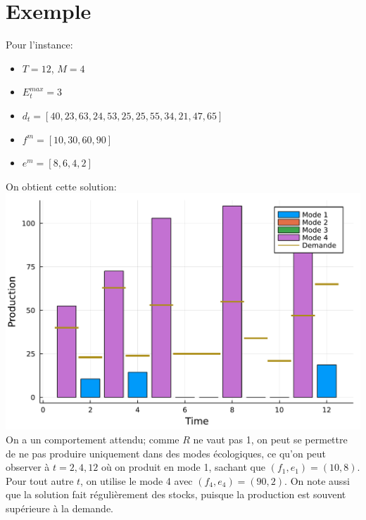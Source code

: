 \documentclass{article}
\begin{document}
	\section{Exemple}
	Pour l'instance:
	\begin{itemize}
		\item $T = 12$, $M = 4$
		\item $E_t^{max} = 3$
		\item $d_t = [40, 23, 63, 24, 53, 25, 25, 55, 34, 21, 47, 65]$
		\item $f^m = [10, 30, 60, 90]$
		\item $e^m = [8, 6, 4, 2]$
	\end{itemize}
	On obtient cette solution:\\
	\includegraphics[width=\textwidth]{exemple.pdf}
	\normalsize
	On a un comportement attendu; comme $R$ ne vaut pas 1, on peut se permettre de ne pas produire uniquement dans des modes écologiques, ce qu'on peut observer à $t = 2,4,12$ où on produit en mode 1, sachant que $(f_1, e_1) = (10, 8)$. Pour tout autre $t$, on utilise le mode 4 avec $(f_4, e_4) = (90, 2)$. On note aussi que la solution fait régulièrement des stocks, puisque la production est souvent supérieure à la demande.\\
	\newpage
\end{document}
